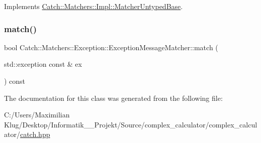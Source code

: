 Implements \mbox{\hyperlink{class_catch_1_1_matchers_1_1_impl_1_1_matcher_untyped_base_a91d3a907dbfcbb596077df24f6e11fe2}{Catch\+::\+Matchers\+::\+Impl\+::\+Matcher\+Untyped\+Base}}.

\mbox{\label{class_catch_1_1_matchers_1_1_exception_1_1_exception_message_matcher_aa0566d24990d69e96495360b8f79593d}} 
\subsubsection{\texorpdfstring{match()}{match()}}
{\footnotesize\ttfamily bool Catch\+::\+Matchers\+::\+Exception\+::\+Exception\+Message\+Matcher\+::match (\begin{DoxyParamCaption}\item[{std\+::exception const \&}]{ex }\end{DoxyParamCaption}) const\hspace{0.3cm}{\ttfamily [override]}}



The documentation for this class was generated from the following file\+:\begin{DoxyCompactItemize}
\item 
C\+:/\+Users/\+Maximilian Klug/\+Desktop/\+Informatik\+\_\+\_\+\+Projekt/\+Source/complex\+\_\+calculator/complex\+\_\+calculator/\mbox{\hyperlink{catch_8hpp}{catch.\+hpp}}\end{DoxyCompactItemize}
